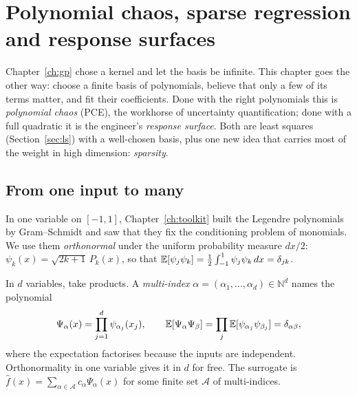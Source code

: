 \chapter[Polynomial chaos and sparse regression]{Polynomial chaos, sparse regression and response surfaces}
\label{ch:pce}

Chapter~\ref{ch:gp} chose a kernel and let the basis be infinite. This chapter goes the other way: choose a finite
basis of polynomials, believe that only a few of its terms matter, and fit their coefficients. Done with the right
polynomials this is \emph{polynomial chaos} (PCE), the workhorse of uncertainty quantification; done with a full
quadratic it is the engineer's \emph{response surface}. Both are least squares (Section~\ref{sec:ls}) with a
well-chosen basis, plus one new idea that carries most of the weight in high dimension: \emph{sparsity}.

\section{From one input to many}
\label{sec:pce_basis}

In one variable on $[-1,1]$, Chapter~\ref{ch:toolkit} built the Legendre polynomials by Gram--Schmidt and saw that
they fix the conditioning problem of monomials. We use them \emph{orthonormal} under the uniform probability measure
$dx/2$: $\psi_k(x) = \sqrt{2k+1}\,P_k(x)$, so that $\mathbb{E}[\psi_j\psi_k] = \tfrac12\int_{-1}^1 \psi_j\psi_k\,dx =
\delta_{jk}$.

In $d$ variables, take products. A \emph{multi-index} $\alpha = (\alpha_1,\dots,\alpha_d) \in \mathbb{N}^d$ names
the polynomial
\begin{equation}
  \Psi_\alpha(x) = \prod_{j=1}^d \psi_{\alpha_j}(x_j), \qquad \mathbb{E}[\Psi_\alpha\Psi_\beta] = \prod_j
  \mathbb{E}[\psi_{\alpha_j}\psi_{\beta_j}] = \delta_{\alpha\beta},
  \label{eq:tensor_basis}
\end{equation}
where the expectation factorises because the inputs are independent. Orthonormality in one variable gives it in $d$
for free. The surrogate is $\hat f(x) = \sum_{\alpha \in \mathcal{A}} c_\alpha \Psi_\alpha(x)$ for some finite set
$\mathcal{A}$ of multi-indices.

